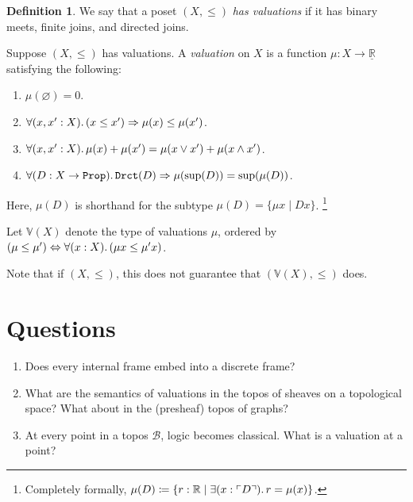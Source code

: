 \documentclass[11pt, oneside, article]{memoir}
\theoremstyle{plain}
\theoremstyle{definition}
\newtheorem{definition}[theorem]{Definition}
\theoremstyle{remark}
\DeclarePairedDelimiter{\subtype}{\ulcorner}{\urcorner}
\newcommand{\const}[1]{\mathtt{#1}}
\newcommand{\cat}[1]{\mathcal{#1}}
\newcommand{\ul}[1]{\underline{#1}}
\newcommand{\RR}{\mathbb{R}}
\newcommand{\VV}{\mathbb{V}}
\newcommand{\LR}{\ul{\mathbb{R}}}
\newcommand{\Prop}{\const{Prop}}
\newcommand{\imp}{\Rightarrow}
\renewcommand{\iff}{\Leftrightarrow}
\begin{document}
\begin{definition}
We say that a poset $(X,\leq)$ \emph{has valuations} if it has binary meets, finite joins, and directed joins.

Suppose $(X,\leq)$ has valuations. A \emph{valuation} on $X$ is a function $\mu:X\to\LR$ satisfying the following:
\begin{enumerate}
	\item $\mu(\varnothing)=0$.
	\item $\forall(x,x':X)\ldotp(x\leq x')\imp\mu(x)\leq\mu(x')$.
	\item $\forall(x,x':X)\ldotp\mu(x)+\mu(x')=\mu(x\vee x')+\mu(x\wedge x')$.
	\item $\forall(D:X\to\Prop)\ldotp\const{Drct}(D)\imp \mu(\sup(D))=\sup(\mu(D))$.
\end{enumerate}
Here, $\mu(D)$ is shorthand for the subtype $\mu(D)=\{\mu x\mid Dx\}$.%
\footnote{Completely formally, $\mu(D)\coloneqq\{r:\RR\mid\exists(x:\subtype{D})\ldotp r=\mu(x)\}$.}

Let $\VV(X)$ denote the type of valuations $\mu$, ordered by $(\mu\leq\mu')\iff\forall(x:X)\ldotp(\mu x\leq \mu'x)$.
\end{definition}

Note that if $(X,\leq)$, this does not guarantee that $(\VV(X),\leq)$ does.


\chapter{Questions}

\begin{enumerate}
	\item Does every internal frame embed into a discrete frame?
	\item What are the semantics of valuations in the topos of sheaves on a topological space? What about in the (presheaf) topos of graphs?
	\item At every point in a topos $\cat{B}$, logic becomes classical. What is a valuation at a point?
\end{enumerate}
\end{document}
